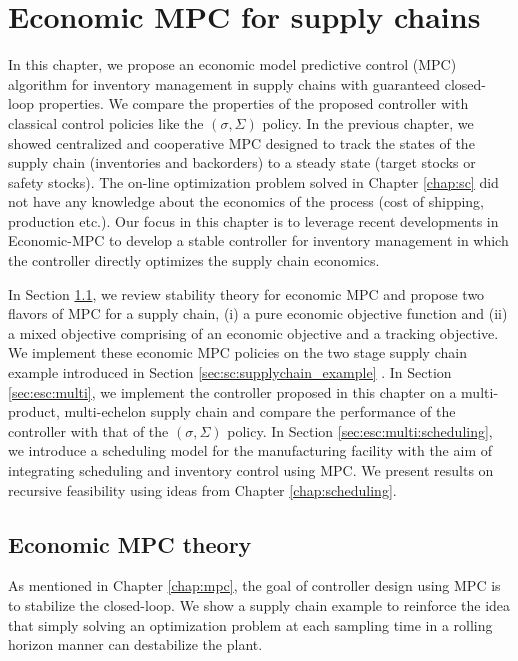 \newcommand{\bx}{\mathbf{x}}
\newcommand{\bd}{\mathbf{d}}


\chapter{Economic MPC for supply chains}
\label{chap:esc}
In this chapter, we propose an  economic model predictive
control (MPC) algorithm for inventory management in supply
chains with guaranteed closed-loop properties. We compare the
properties of the proposed controller with classical control policies
like the $(\sigma,\Sigma) $ policy. In the previous chapter, we showed
centralized and cooperative MPC designed to track the states of the
supply chain (inventories and backorders) to a steady state (target
stocks or safety stocks). The on-line optimization problem solved in
Chapter \ref{chap:sc} did not have any knowledge about the economics
of the process (\eg  cost of shipping, production etc.). Our focus in
this chapter is to leverage  recent developments in Economic-MPC
\citep{amrit:rawlings:angeli:2011,diehl:amrit:rawlings:2011} to
develop a stable controller for inventory management in which the
controller directly optimizes the supply chain economics. 

In Section \ref{sec:esc:economicMPC}, we review stability theory for economic
MPC and propose two flavors of MPC for a
supply chain, (i) a pure economic objective function and (ii) a mixed
objective comprising of an economic objective and a tracking
objective. We implement these economic MPC policies on the two stage
supply chain example introduced in Section
\ref{sec:sc:supplychain_example} . In Section
\ref{sec:esc:multi}, we implement the 
controller proposed in this chapter on a multi-product, multi-echelon
supply chain and compare the performance of the controller with that
of the $(\sigma,\Sigma) $ policy. In Section \ref{sec:esc:multi:scheduling}, we
introduce a scheduling model for the manufacturing facility with the
aim of integrating scheduling and inventory control using MPC. We
present results on recursive feasibility using ideas from
Chapter \ref{chap:scheduling}.


\section{Economic MPC theory}
\label{sec:esc:economicMPC}

As mentioned in Chapter \ref{chap:mpc}, the goal of controller design
using MPC is to stabilize the closed-loop. We show a supply chain
example to reinforce the idea that
simply solving an optimization problem at each sampling time in a
rolling horizon manner can destabilize the plant. 

